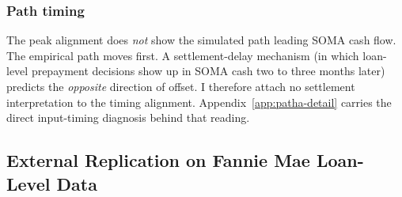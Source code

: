 \documentclass[12pt]{article}
\begin{document}
\subsubsection{Path timing}

The peak alignment does \emph{not} show the simulated path leading SOMA cash flow. The empirical path moves first. A settlement-delay mechanism (in which loan-level prepayment decisions show up in SOMA cash two to three months later) predicts the \emph{opposite} direction of offset. I therefore attach no settlement interpretation to the timing alignment. Appendix~\ref{app:patha-detail} carries the direct input-timing diagnosis behind that reading.

\subsection{External Replication on Fannie Mae Loan-Level Data}\label{sec:pathb-fannie}
\end{document}
